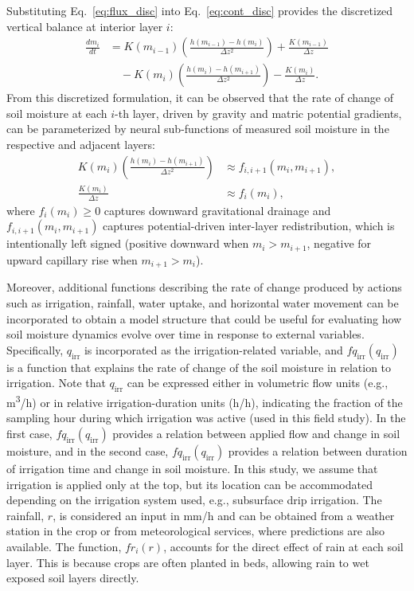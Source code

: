 \documentclass[pdflatex,sn-nature]{sn-jnl}%
\theoremstyle{thmstyleone}%
\theoremstyle{thmstyletwo}%
\theoremstyle{thmstylethree}%
\begin{document}
Substituting Eq.~\eqref{eq:flux_disc} into Eq.~\eqref{eq:cont_disc} provides the discretized vertical balance at interior layer $i$:
\begin{equation}
\begin{aligned}
\frac{d m_i}{d t} &= K(m_{i-1})\left(\frac{h(m_{i-1})-h(m_{i})}{\Delta z^2}\right) + \frac{K(m_{i-1})}{\Delta z} \\
&\quad - K(m_{i})\left(\frac{h(m_{i})-h(m_{i+1})}{\Delta z^2}\right) - \frac{K(m_{i})}{\Delta z}.
\end{aligned}
\label{eq:disc_richards}
\end{equation}
From this discretized formulation, it can be observed that the rate of change of soil moisture at each $i$-th layer, driven by gravity and matric potential gradients, can be parameterized by neural sub-functions of measured soil moisture in the respective and adjacent layers:
\begin{equation}
\begin{aligned}
K(m_{i})\left(\frac{h(m_{i})-h(m_{i+1})}{\Delta z^2}\right) &\approx f_{i,i+1}({m}_i,{m}_{i+1}), \\ 
\frac{K(m_{i})}{\Delta z} &\approx f_i({m}_i),
\end{aligned}
\end{equation}
where $f_i(m_i) \ge 0$ captures downward gravitational drainage and $f_{i,i+1}(m_i, m_{i+1})$ captures potential-driven inter-layer redistribution, which is intentionally left signed (positive downward when $m_i > m_{i+1}$, negative for upward capillary rise when $m_{i+1} > m_i$).

Moreover, additional functions describing the rate of change produced by actions such as irrigation, rainfall, water uptake, and horizontal water movement can be incorporated to obtain a model structure that could be useful for evaluating how soil moisture dynamics evolve over time in response to external variables. Specifically, $q_{\mathrm{irr}}$ is incorporated as the irrigation-related variable, and $fq_{\mathrm{irr}}(q_{\mathrm{irr}})$ is a function that explains the rate of change of the soil moisture in relation to irrigation. Note that $q_{\mathrm{irr}}$ can be expressed either in volumetric flow units (e.g., \si{m^3/h}) or in relative irrigation-duration units (\si{h/h}), indicating the fraction of the sampling hour during which irrigation was active (used in this field study). In the first case, $fq_{\mathrm{irr}}(q_{\mathrm{irr}})$ provides a relation between applied flow and change in soil moisture, and in the second case, $fq_{\mathrm{irr}}(q_{\mathrm{irr}})$ provides a relation between duration of irrigation time and change in soil moisture. In this study, we assume that irrigation is applied only at the top, but its location can be accommodated depending on the irrigation system used, e.g., subsurface drip irrigation. 
The rainfall, $r$, is considered an input in \si{mm/h} and can be obtained from a weather station in the crop or from meteorological services, where predictions are also available. The function, $fr_i(r)$, accounts for the direct effect of rain at each soil layer. This is because crops are often planted in beds, allowing rain to wet exposed soil layers directly.
\end{document}
